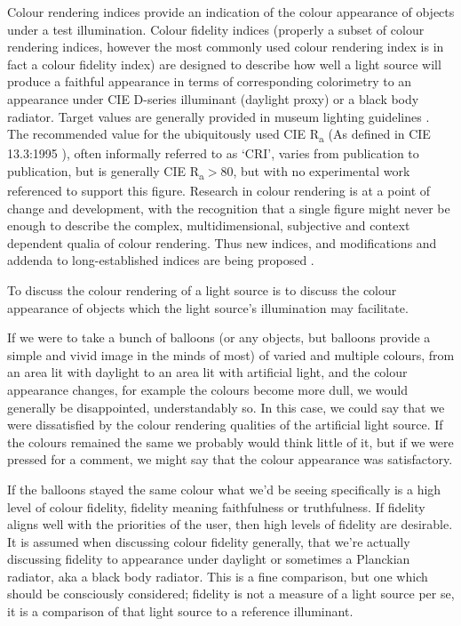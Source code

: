 Colour rendering indices provide an indication of the colour appearance of objects under a test illumination. Colour fidelity indices (properly a subset of colour rendering indices, however the most commonly used colour rendering index is in fact a colour fidelity index) are designed to describe how well a light source will produce a faithful appearance in terms of corresponding colorimetry to an appearance under CIE D-series illuminant (daylight proxy) or a black body radiator. Target values are generally provided in museum lighting guidelines \citep{ies_ies_1996,druzik_guidelines_2012,cibse_lighting_2015,thomson_museum_1986}. The recommended value for the ubiquitously used CIE R\textsubscript{a} (As defined in CIE 13.3:1995 \citep{cie_cie_1995}), often informally referred to as `CRI', varies from publication to publication, but is generally CIE R\textsubscript{a}$>$80, but with no experimental work referenced to support this figure. Research in colour rendering is at a point of change and development, with the recognition that a single figure might never be enough to describe the complex, multidimensional, subjective and context dependent qualia of colour rendering\citep{rea_color_2008}. Thus new indices, and modifications and addenda to long-established indices are being proposed \citep{smet_memory_2012,davis_color_2010,rea_practical_2010,color_metric_task_group_of_the_ies_ies_2015,teunissen_characterising_2016}.

To discuss the colour rendering of a light source is to discuss the colour appearance of objects which the light source's illumination may facilitate. 

If we were to take a bunch of balloons (or any objects, but balloons provide a simple and vivid image in the minds of most) of varied and multiple colours, from an area lit with daylight to an area lit with artificial light, and the colour appearance changes, for example the colours become more dull, we would generally be disappointed, understandably so. In this case, we could say that we were dissatisfied by the colour rendering qualities of the artificial light source. If the colours remained the same we probably would think little of it, but if we were pressed for a comment, we might say that the colour appearance was satisfactory.

If the balloons stayed the same colour what we'd be seeing specifically is a high level of colour fidelity, fidelity meaning faithfulness or truthfulness. If fidelity aligns well with the priorities of the user, then high levels of fidelity are desirable. It is assumed when discussing colour fidelity generally, that we're actually discussing fidelity to appearance under daylight or sometimes a Planckian radiator, aka a black body radiator. This is a fine comparison, but one which should be consciously considered; fidelity is not a measure of a light source per se, it is a comparison of that light source to a reference illuminant.

